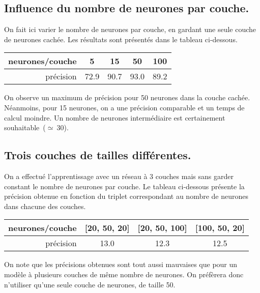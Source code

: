 \documentclass[a4paper, 12pt]{article}
\begin{document}
\subsection{Influence du nombre de neurones par couche.}
On fait ici varier le nombre de neurones par couche, en gardant une seule couche de neurones cachée.
Les résultats sont présentés dans le tableau ci-dessous.
\begin{center}
    \begin{tabular}{|r|c|c|c|c|}
        \hline
        neurones/couche & 5 & 15 & 50 & 100 \\
        \hline
        précision & \num{72.9} & \num{90.7} & \num{93.0} & \num{89.2} \\
        \hline
    \end{tabular}
\end{center}
On observe un maximum de précision pour 50 neurones dans la couche cachée.
Néanmoins, pour 15 neurones, on a une précision comparable et un temps de calcul moindre.
Un nombre de neurones intermédiaire est certainement souhaitable~($\simeq~\num{30}$).

\subsection{Trois couches de tailles différentes.}
On a effectué l'apprentissage avec un réseau à 3 couches mais sans garder constant le nombre de neurones par couche.
Le tableau ci-dessous présente la précision obtenue en fonction du triplet correspondant au nombre de neurones dans chacune des couches.
\begin{center}
    \begin{tabular}{|r|c|c|c|}
        \hline
        neurones/couche & [20, 50, 20] & [20, 50, 100] & [100, 50, 20] \\
        \hline
        précision & \num{13.0} & \num{12.3} & \num{12.5} \\
        \hline
    \end{tabular}
\end{center}
On note que les précisions obtenues sont tout aussi mauvaises que pour un modèle à plusieurs couches de même nombre de neurones.
On préfèrera donc n'utiliser qu'une seule couche de neurones, de taille 50.
\end{document}
